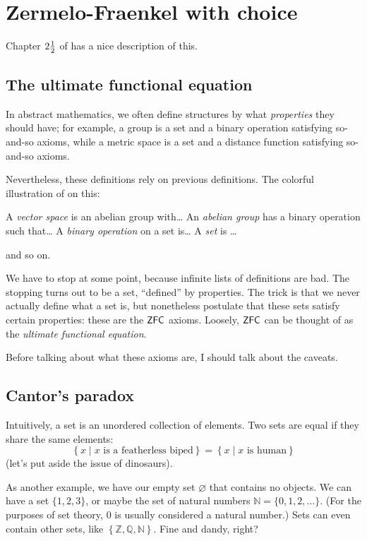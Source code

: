 \chapter{Zermelo-Fraenkel with choice}
\label{ch:zfc}
Chapter $2\frac{1}{2}$ of \cite{ref:msci} has a nice description of this.

\section{The ultimate functional equation}
In abstract mathematics, we often define structures by what \emph{properties}
they should have; for example, a group is a set and a binary operation
satisfying so-and-so axioms, while a metric space is a set and a distance function
satisfying so-and-so axioms.

Nevertheless, these definitions rely on previous definitions.
The colorful illustration of \cite{ref:msci} on this:
\begin{itemize}
	\ii A \emph{vector space} is an abelian group with\dots
	\ii An \emph{abelian group} has a binary operation such that\dots
	\ii A \emph{binary operation} on a set is\dots
	\ii A \emph{set} is \dots
\end{itemize}
and so on.

We have to stop at some point, because infinite lists of definitions are bad.
The stopping turns out to be a set, ``defined'' by properties.
The trick is that we never actually define what a set is,
but nonetheless postulate that these sets satisfy certain properties:
these are the $\mathsf{ZFC}$ axioms.
Loosely, $\mathsf{ZFC}$ can be thought of as the \emph{ultimate functional equation}.

Before talking about what these axioms are, I should talk about the caveats.

\section{Cantor's paradox}
Intuitively, a set is an unordered collection of elements.
Two sets are equal if they share the same elements:
\[
	\left\{ x \mid x \text{ is a featherless biped} \right\}
	=
	\left\{ x \mid x \text{ is human} \right\}
\]
(let's put aside the issue of dinosaurs).

As another example, we have our empty set $\varnothing$ that contains no objects.
We can have a set $\{1, 2, 3\}$, or maybe the set of natural numbers $\mathbb N = \{0, 1, 2, \dots \}$.
(For the purposes of set theory, $0$ is usually considered a natural number.)
Sets can even contain other sets, like $\left\{ \mathbb Z, \mathbb Q, \mathbb N \right\}$. Fine and dandy, right?

